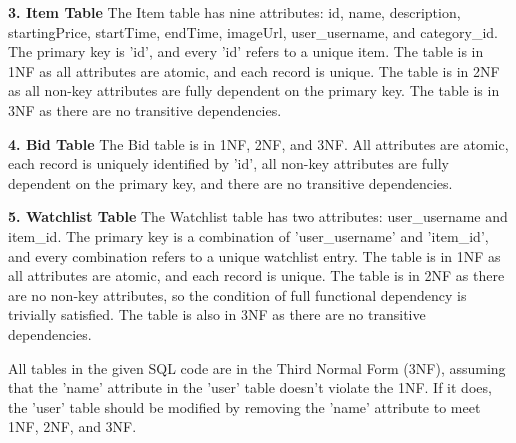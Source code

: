 \textbf{3. Item Table}
The Item table has nine attributes: id, name, description, startingPrice, startTime, endTime, imageUrl, user\_username, and category\_id. The primary key is 'id', and every 'id' refers to a unique item.
The table is in 1NF as all attributes are atomic, and each record is unique.
The table is in 2NF as all non-key attributes are fully dependent on the primary key.
The table is in 3NF as there are no transitive dependencies.


\textbf{4. Bid Table}
The Bid table is in 1NF, 2NF, and 3NF. All attributes are atomic, each record is uniquely identified by 'id', all non-key attributes are fully dependent on the primary key, and there are no transitive dependencies.


\textbf{5. Watchlist Table}
The Watchlist table has two attributes: user\_username and item\_id. The primary key is a combination of 'user\_username' and 'item\_id', and every combination refers to a unique watchlist entry.
The table is in 1NF as all attributes are atomic, and each record is unique.
The table is in 2NF as there are no non-key attributes, so the condition of full functional dependency is trivially satisfied.
The table is also in 3NF as there are no transitive dependencies.


All tables in the given SQL code are in the Third Normal Form (3NF), assuming that the 'name' attribute in the 'user' table doesn't violate the 1NF. If it does, the 'user' table should be modified by removing the 'name' attribute to meet 1NF, 2NF, and 3NF.